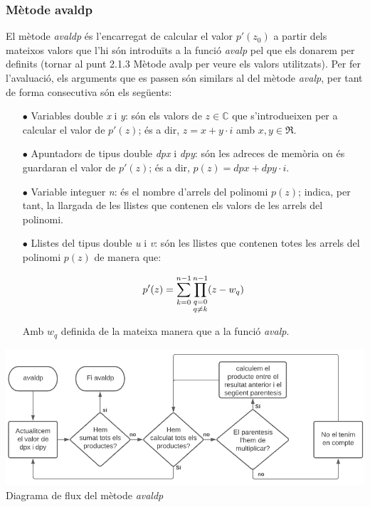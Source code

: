 \documentclass[12pt]{report}
\begin{document}
\subsubsection{Mètode avaldp}
El mètode \textit{avaldp} és l'encarregat de calcular el valor $p'(z_0)$ a partir dels mateixos valors que l'hi són introduïts a la funció \textit{avalp} pel que els donarem per definits (tornar al punt 2.1.3 Mètode avalp per veure els valors utilitzats).
\newline
Per fer l'avaluació, els arguments que es passen són similars al del mètode \textit{avalp}, per tant de forma consecutiva són els següents:
\begin{itemize}
    \item [$\bullet$] Variables double \textit{x} i \textit{y}: són els valors de $z\in\mathbb{C}$ que s'introdueixen per a calcular el valor de $p'(z)$; és a dir, $z=x+y\cdot i$ amb $x,y\in\Re$.
    \item [$\bullet$] Apuntadors de tipus double \textit{dpx} i \textit{dpy}: són les adreces de memòria on és guardaran el valor de $p'(z)$; és a dir, $p(z)=dpx+dpy\cdot i$.
    \item [$\bullet$] Variable integuer \textit{n}: és el nombre d'arrels del polinomi $p(z)$; indica, per tant, la llargada de les llistes que contenen els valors de les arrels del polinomi.
    \item [$\bullet$] Llistes del tipus double \textit{u} i \textit{v}: són les llistes que contenen totes les arrels del polinomi $p(z)$ de manera que:

        \[p'(z)= \sum_{\begin{subarray} \text{k}=0\end{subarray}}^{n-1} \prod_{\substack{q=0\\q\ne k}}^{n-1}(z-w_q) \]

    Amb $w_q$ definida de la mateixa manera que a la funció \textit{avalp}.
\end{itemize}

\begin{center}
    \includegraphics[width=1\textwidth]{UML_avaldp.PNG}
     \newline
Diagrama de flux del mètode \textit{avaldp}
\label{fig:UML_avalp}
\end{center}
\end{document}
